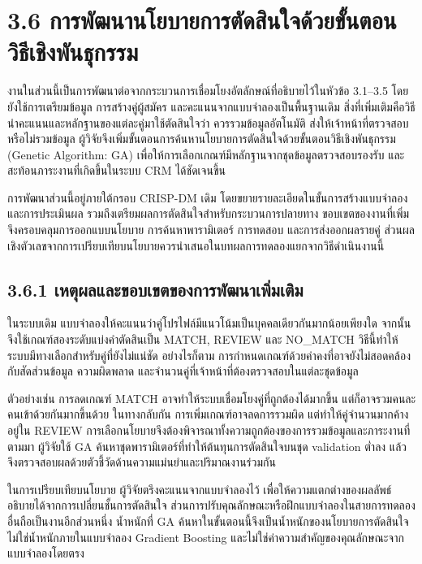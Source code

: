 \section*{3.6 การพัฒนานโยบายการตัดสินใจด้วยขั้นตอนวิธีเชิงพันธุกรรม}
งานในส่วนนี้เป็นการพัฒนาต่อจากกระบวนการเชื่อมโยงอัตลักษณ์ที่อธิบายไว้ในหัวข้อ 3.1--3.5 โดยยังใช้การเตรียมข้อมูล การสร้างคู่ผู้สมัคร และคะแนนจากแบบจำลองเป็นพื้นฐานเดิม สิ่งที่เพิ่มเติมคือวิธีนำคะแนนและหลักฐานของแต่ละคู่มาใช้ตัดสินใจว่า ควรรวมข้อมูลอัตโนมัติ ส่งให้เจ้าหน้าที่ตรวจสอบ หรือไม่รวมข้อมูล ผู้วิจัยจึงเพิ่มขั้นตอนการค้นหานโยบายการตัดสินใจด้วยขั้นตอนวิธีเชิงพันธุกรรม (Genetic Algorithm: GA) เพื่อให้การเลือกเกณฑ์มีหลักฐานจากชุดข้อมูลตรวจสอบรองรับ และสะท้อนภาระงานที่เกิดขึ้นในระบบ CRM ได้ชัดเจนขึ้น

การพัฒนาส่วนนี้อยู่ภายใต้กรอบ CRISP-DM เดิม โดยขยายรายละเอียดในขั้นการสร้างแบบจำลองและการประเมินผล รวมถึงเตรียมผลการตัดสินใจสำหรับกระบวนการปลายทาง ขอบเขตของงานที่เพิ่มจึงครอบคลุมการออกแบบนโยบาย การค้นหาพารามิเตอร์ การทดสอบ และการส่งออกผลรายคู่ ส่วนผลเชิงตัวเลขจากการเปรียบเทียบนโยบายควรนำเสนอในบทผลการทดลองแยกจากวิธีดำเนินงานนี้

\subsection*{3.6.1 เหตุผลและขอบเขตของการพัฒนาเพิ่มเติม}
ในระบบเดิม แบบจำลองให้คะแนนว่าคู่โปรไฟล์มีแนวโน้มเป็นบุคคลเดียวกันมากน้อยเพียงใด จากนั้นจึงใช้เกณฑ์สองระดับแบ่งคำตัดสินเป็น MATCH, REVIEW และ NO\_MATCH วิธีนี้ทำให้ระบบมีทางเลือกสำหรับคู่ที่ยังไม่แน่ชัด อย่างไรก็ตาม การกำหนดเกณฑ์ด้วยค่าคงที่อาจยังไม่สอดคล้องกับสัดส่วนข้อมูล ความผิดพลาด และจำนวนคู่ที่เจ้าหน้าที่ต้องตรวจสอบในแต่ละชุดข้อมูล

ตัวอย่างเช่น การลดเกณฑ์ MATCH อาจทำให้ระบบเชื่อมโยงคู่ที่ถูกต้องได้มากขึ้น แต่ก็อาจรวมคนละคนเข้าด้วยกันมากขึ้นด้วย ในทางกลับกัน การเพิ่มเกณฑ์อาจลดการรวมผิด แต่ทำให้คู่จำนวนมากค้างอยู่ใน REVIEW การเลือกนโยบายจึงต้องพิจารณาทั้งความถูกต้องของการรวมข้อมูลและภาระงานที่ตามมา ผู้วิจัยใช้ GA ค้นหาชุดพารามิเตอร์ที่ทำให้ต้นทุนการตัดสินใจบนชุด validation ต่ำลง แล้วจึงตรวจสอบผลด้วยตัวชี้วัดด้านความแม่นยำและปริมาณงานร่วมกัน

ในการเปรียบเทียบนโยบาย ผู้วิจัยตรึงคะแนนจากแบบจำลองไว้ เพื่อให้ความแตกต่างของผลลัพธ์อธิบายได้จากการเปลี่ยนชั้นการตัดสินใจ ส่วนการปรับคุณลักษณะหรือฝึกแบบจำลองในสายการทดลองอื่นถือเป็นงานอีกส่วนหนึ่ง น้ำหนักที่ GA ค้นหาในขั้นตอนนี้จึงเป็นน้ำหนักของนโยบายการตัดสินใจ ไม่ใช่น้ำหนักภายในแบบจำลอง Gradient Boosting และไม่ใช่ค่าความสำคัญของคุณลักษณะจากแบบจำลองโดยตรง

